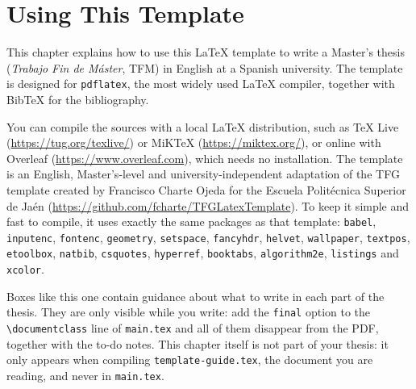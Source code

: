 \chapter{Using This Template}\label{ch:guide}

This chapter explains how to use this \LaTeX{} template to write a Master's thesis
(\textit{Trabajo Fin de Máster}, TFM) in English at a Spanish university. The template is
designed for \texttt{pdflatex}, the most widely used \LaTeX{} compiler, together with BibTeX
for the bibliography.

You can compile the sources with a local \LaTeX{} distribution, such as TeX Live
(\url{https://tug.org/texlive/}) or MiKTeX (\url{https://miktex.org/}), or online with
Overleaf (\url{https://www.overleaf.com}), which needs no installation. The template is an
English, Master's-level and university-independent adaptation of the TFG template created
by Francisco Charte Ojeda for the Escuela Politécnica Superior de Jaén
(\url{https://github.com/fcharte/TFGLatexTemplate}). To keep it simple and fast to compile,
it uses exactly the same packages as that template: \texttt{babel}, \texttt{inputenc},
\texttt{fontenc}, \texttt{geometry}, \texttt{setspace}, \texttt{fancyhdr}, \texttt{helvet},
\texttt{wallpaper}, \texttt{textpos}, \texttt{etoolbox}, \texttt{natbib}, \texttt{csquotes},
\texttt{hyperref}, \texttt{booktabs}, \texttt{algorithm2e}, \texttt{listings} and
\texttt{xcolor}.

\begin{guidance}
Boxes like this one contain guidance about what to write in each part of the thesis. They
are only visible while you write: add the \texttt{final} option to the
\texttt{\textbackslash documentclass} line of \texttt{main.tex} and all of them
disappear from the PDF, together with the to-do notes. This chapter itself is not part of
your thesis: it only appears when compiling \texttt{template-guide.tex}, the document you
are reading, and never in \texttt{main.tex}.
\end{guidance}

